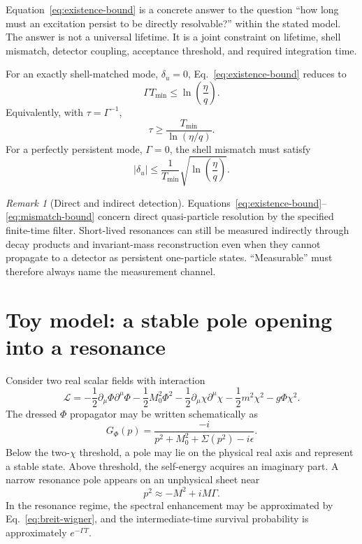 \documentclass[11pt]{article}
\theoremstyle{remark}
\newtheorem{remark}{Remark}
\begin{document}
Equation~\eqref{eq:existence-bound} is a concrete answer to the question ``how long must an excitation persist to be directly resolvable?'' within the stated model. The answer is not a universal lifetime. It is a joint constraint on lifetime, shell mismatch, detector coupling, acceptance threshold, and required integration time.

For an exactly shell-matched mode, $\delta_u=0$, Eq.~\eqref{eq:existence-bound} reduces to
\begin{equation}
  \Gamma T_{\min}
  \le\ln\!\left(\frac{\eta}{q}\right).
  \label{eq:lifetime-only-bound}
\end{equation}
Equivalently, with $\tau=\Gamma^{-1}$,
\begin{equation}
  \tau
  \ge
  \frac{T_{\min}}{\ln(\eta/q)}.
  \label{eq:lifetime-lower-bound}
\end{equation}
For a perfectly persistent mode, $\Gamma=0$, the shell mismatch must satisfy
\begin{equation}
  |\delta_u|
  \le
  \frac{1}{T_{\min}}
  \sqrt{\ln\!\left(\frac{\eta}{q}\right)}.
  \label{eq:mismatch-bound}
\end{equation}

\begin{remark}[Direct and indirect detection]
Equations~\eqref{eq:existence-bound}--\eqref{eq:mismatch-bound} concern direct quasi-particle resolution by the specified finite-time filter. Short-lived resonances can still be measured indirectly through decay products and invariant-mass reconstruction even when they cannot propagate to a detector as persistent one-particle states. ``Measurable'' must therefore always name the measurement channel.
\end{remark}

\section{Toy model: a stable pole opening into a resonance}

Consider two real scalar fields with interaction
\begin{equation}
  \mathcal L
  =-\frac12\partial_\mu\Phi\partial^\mu\Phi
   -\frac12M_0^2\Phi^2
   -\frac12\partial_\mu\chi\partial^\mu\chi
   -\frac12m^2\chi^2
   -g\Phi\chi^2.
  \label{eq:toy-lagrangian}
\end{equation}
The dressed $\Phi$ propagator may be written schematically as
\begin{equation}
  G_\Phi(p)
  =\frac{-i}{p^2+M_0^2+\Sigma(p^2)-i\epsilon}.
  \label{eq:dressed-propagator}
\end{equation}
Below the two-$\chi$ threshold, a pole may lie on the physical real axis and represent a stable state. Above threshold, the self-energy acquires an imaginary part. A narrow resonance pole appears on an unphysical sheet near
\begin{equation}
  p^2\approx -M^2+iM\Gamma.
  \label{eq:complex-pole}
\end{equation}
In the resonance regime, the spectral enhancement may be approximated by Eq.~\eqref{eq:breit-wigner}, and the intermediate-time survival probability is approximately $e^{-\Gamma T}$.
\end{document}
